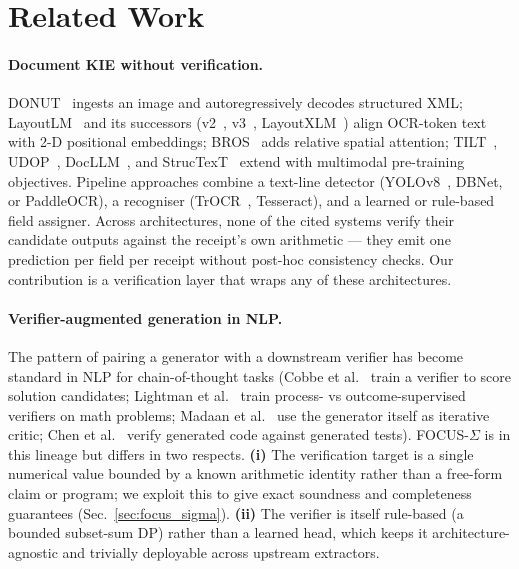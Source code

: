
\section{Related Work}
\label{sec:related}

\paragraph{Document KIE without verification.}
DONUT~\cite{kim2022donut} ingests an image and autoregressively decodes
structured XML; LayoutLM~\cite{xu2020layoutlm} and its successors
(v2~\cite{xu2021layoutlmv2}, v3~\cite{huang2022layoutlmv3},
LayoutXLM~\cite{xu2021layoutxlm}) align OCR-token text with 2-D
positional embeddings; BROS~\cite{hong2022bros} adds relative spatial
attention; TILT~\cite{powalski2021going}, UDOP~\cite{tang2023unifying},
DocLLM~\cite{wang2023docllm}, and StrucTexT~\cite{li2021structext}
extend with multimodal pre-training objectives.  Pipeline approaches
combine a text-line detector (YOLOv8~\cite{jocher2023yolov8}, DBNet,
or PaddleOCR), a recogniser
(TrOCR~\cite{li2023trocr}, Tesseract), and a learned or
rule-based field assigner.  Across architectures, none of the cited
systems verify their candidate outputs against the receipt's own
arithmetic — they emit one prediction per field per receipt without
post-hoc consistency checks.  Our contribution is a verification layer
that wraps any of these architectures.

\paragraph{Verifier-augmented generation in NLP.}
The pattern of pairing a generator with a downstream verifier has
become standard in NLP for chain-of-thought tasks
(Cobbe et al.~\cite{cobbe2021training} train a verifier to score
solution candidates;  Lightman et al.~\cite{lightman2023verify}
train process- vs outcome-supervised verifiers on math problems;
Madaan et al.~\cite{madaan2023selfrefine} use the generator itself
as iterative critic; Chen et al.~\cite{chen2022codet} verify
generated code against generated tests).
FOCUS-$\Sigma$ is in this lineage but differs in two respects.
\textbf{(i)} The verification target is a single numerical value
bounded by a known arithmetic identity rather than a free-form claim
or program; we exploit this to give exact soundness and completeness
guarantees (Sec.~\ref{sec:focus_sigma}).
\textbf{(ii)} The verifier is itself rule-based (a bounded subset-sum
DP) rather than a learned head, which keeps it
architecture-agnostic and trivially deployable across upstream
extractors.

